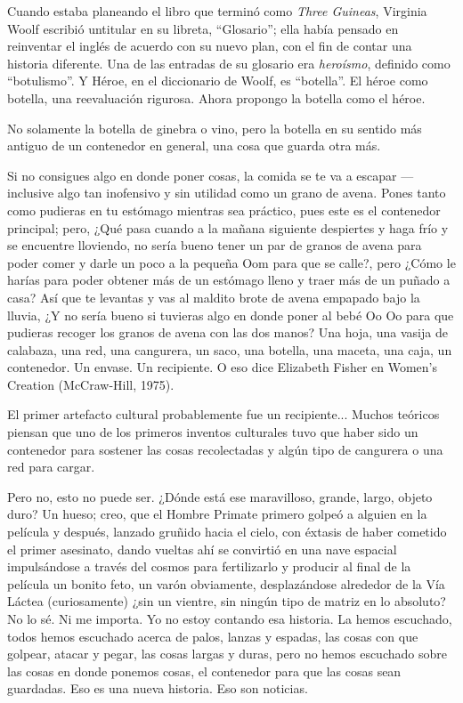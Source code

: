 Cuando estaba planeando el libro que terminó
como \textit{Three Guineas}, Virginia Woolf escribió
untitular en su libreta, ``Glosario''; ella había
pensado en reinventar el inglés de acuerdo con
su nuevo plan, con el fin de contar una historia
diferente. Una de las entradas de su glosario era
\textit{heroísmo}, definido como ``botulismo''. Y Héroe,
en el diccionario de Woolf, es ``botella''. El héroe
como botella, una reevaluación rigurosa. Ahora
propongo la botella como el héroe.

No solamente la botella de ginebra o vino, pero
la botella en su sentido más antiguo de un
contenedor en general, una cosa que guarda otra
más.

Si no consigues algo en donde poner cosas, la
comida se te va a escapar ---inclusive algo tan
inofensivo y sin utilidad como un grano de avena.
Pones tanto como pudieras en tu estómago
mientras sea práctico, pues este es el contenedor
principal; pero, ¿Qué pasa cuando a la mañana
siguiente despiertes y haga frío y se encuentre
lloviendo, no sería bueno tener un par de granos
de avena para poder comer y darle un poco a la
pequeña Oom para que se calle?, pero ¿Cómo le
harías para poder obtener más de un estómago
lleno y traer más de un puñado a casa? Así que te
levantas y vas al maldito brote de avena
empapado bajo la lluvia, ¿Y no sería bueno si
tuvieras algo en donde poner al bebé Oo Oo para
que pudieras recoger los granos de avena con las
dos manos? Una hoja, una vasija de calabaza, una
red, una cangurera, un saco, una botella, una
maceta, una caja, un contenedor. Un envase. Un
recipiente. O eso dice Elizabeth Fisher en Women’s
Creation (McCraw-Hill, 1975).

\begin{displayquote}
    El primer artefacto cultural
    probablemente fue un recipiente...
    Muchos teóricos piensan que uno de los
    primeros inventos culturales tuvo que
    haber sido un contenedor para sostener
    las cosas recolectadas y algún tipo de
    cangurera o una red para cargar.
\end{displayquote}

Pero no, esto no puede ser. ¿Dónde está ese
maravilloso, grande, largo, objeto duro? Un hueso; 
creo, que el Hombre Primate primero golpeó a 
alguien en la película y después, lanzado gruñido hacia el
cielo, con éxtasis de haber cometido el primer
asesinato, dando vueltas ahí se convirtió en una
nave espacial impulsándose a través del cosmos
para fertilizarlo y producir al final de la película
un bonito feto, un varón obviamente,
desplazándose alrededor de la Vía Láctea
(curiosamente) ¿sin un vientre, sin ningún tipo de
matriz en lo absoluto? No lo sé. Ni me importa.
Yo no estoy contando esa historia. La hemos
escuchado, todos hemos escuchado acerca de
palos, lanzas y espadas, las cosas con que
golpear, atacar y pegar, las cosas largas y duras,
pero no hemos escuchado sobre las cosas en
donde ponemos cosas, el contenedor para que
las cosas sean guardadas. Eso es una nueva
historia. Eso son noticias.

